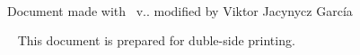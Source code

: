 {\vfill

\begin{large}

\begin{center}
  \textbf{\autorPortadaVal}%


  \leavevmode \\\relax \mbox{ }%
  \textoSegundoSubtituloPortadaVal \leavevmode \\[0.3]
  \leavevmode \\\relax \mbox{ }%

  \textbf{\institucionVal}\leavevmode \\[1em]
  \textbf{\fechaPublicacionVal}

\end{center}

\end{large}

\vfill %


\restoregeometry


\newpage

\thispagestyle{empty} \mbox{ } \vfill%
\begin{small}
  \begin{center}
    \ifx\noTeXiSCreditsVal\undefined Document made with \texis\ v.\texisVer.
    modified by Viktor Jacynycz García \else \mbox{ } \fi
  \end{center}
\end{small}
\vspace*{2cm}
\begin{small}
  \begin{center}
    \ifx\explicacionDobleCaraVal\undefined \mbox{ } \else
    \noindent This document is prepared for duble-side printing. \fi
  \end{center}
\end{small}


\newpage

\thispagestyle{empty}

}
